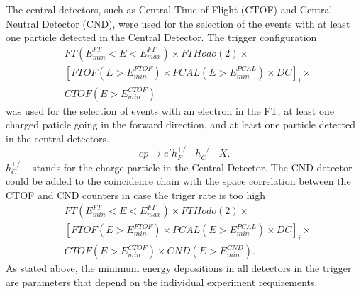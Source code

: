 The central detectors, such as Central Time-of-Flight (CTOF) and Central Neutral Detector (CND), were used for the selection of the events with at least one  particle detected in the Central Detector. 
The trigger configuration
 \begin{align*} 
 &FT(E^{FT}_{min}{<}E{<}E^{FT}_{max}) \times FTHodo(2)\times\\
 & [FTOF(E{>}E^{FTOF}_{min})\times  PCAL(E{>}E^{PCAL}_{min})\times   DC]_i \times \\
 & CTOF(E{>}E^{CTOF}_{min})\end{align*}
\noindent
was used for the selection of events with an electron in the FT, at least one charged paticle going in the forward direction, and at least one particle detected in the central detectors. 
$$
ep\to e' h^{+/-}_F  h^{+/-}_C X.
$$
$h^{+/-}_C$ stands for the charge particle in the Central Detector.
\noindent
The CND detector could be  added to the coincidence chain with the space correlation between the CTOF and CND counters in case the triger rate is too high
 \begin{align*} 
 &FT(E^{FT}_{min}{<}E{<}E^{FT}_{max})\times FTHodo(2)\times \\
 & [FTOF(E{>}E^{FTOF}_{min})\times  PCAL(E{>}E^{PCAL}_{min})\times   DC]_i \times \\
 & CTOF(E{>}E^{CTOF}_{min})\times  CND(E{>}E^{CND}_{min}).
\end{align*}
\noindent
As stated above, the minimum energy depositions in all detectors in the trigger are parameters that depend on the individual experiment requirements.


